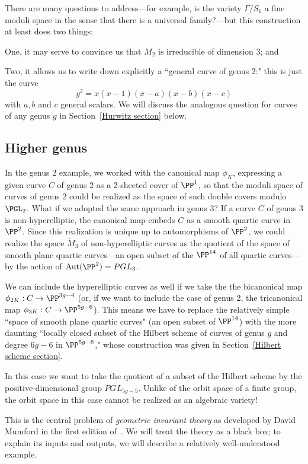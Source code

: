 There are many questions to address---for example, is the variety $\Gamma/S_6$ a fine moduli space in the sense that there is a universal family?---but this construction at least does two things:

One, it may serve to convince us that $M_2$ is irreducible of dimension 3; and

Two, it allows us to write down explicitly a ``general curve of genus 2:" this is just the curve
$$
y^2 = x(x-1)(x-a)(x-b)(x-c)
$$
with $a, b$ and $c$ general scalars. We will discuss the analogous question for curves of any genus $g$ in Section~\ref{Hurwitz section} below.

\subsection{Higher genus}

In the genus 2 example, we worked with the canonical map $\phi_K$, expressing a given curve $C$ of genus 2 as a 2-sheeted cover of $\PP^1$, so that the moduli space of curves of genus 2 could be realized as the space of such double covers modulo $\PGL_2$. What if we adopted the same approach in genus 3? If a curve $C$ of genus 3 is non-hyperelliptic, the canonical map embeds $C$ as a smooth quartic curve in $\PP^2$. Since this realization is unique up to automorphisms of $\PP^2$, we could realize the space $\tilde M_3$ of non-hyperelliptic curves as the quotient of the space of smooth plane quartic curves---an open subset of the $\PP^{14}$ of all quartic curves---by the action of ${\rm Aut}(\PP^2) = PGL_3$. 

We can include the hyperelliptic curves as well if we take the the bicanonical map $\phi_{2K} : C \to \PP^{3g-4}$ (or, if we want to include the case of genus 2, the tricanonical map  $\phi_{3K} : C \to \PP^{5g-6}$). This means we have to replace the relatively simple ``space of smooth plane quartic curves" (an open subset of $\PP^{14}$) with the more daunting ``locally closed subset of the Hilbert scheme of curves of genus $g$ and degree $6g-6$ in $\PP^{5g-6}$," whose construction was given in Section~\ref{Hilbert scheme section}.

In this case we want to take the quotient of a subset of the Hilbert scheme by the positive-dimensional group $PGL_{5g-5}$. Unlike of the orbit space of a finite group, the orbit space in this case cannot be realized as an algebraic variety!

This is the central problem of \emph{geometric invariant theory} as developed by David Mumford in the first edition of~\cite{GIT}. We will treat the theory as a black box; to explain its inputs and outputs, we will describe a relatively well-understood example.

